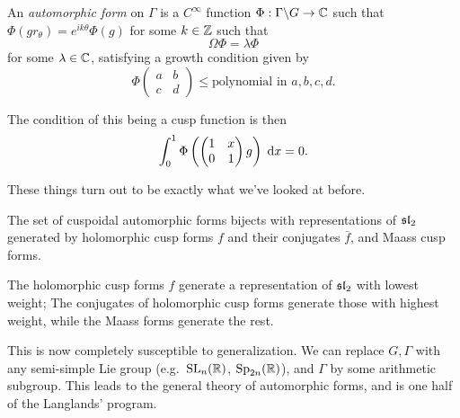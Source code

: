 \documentclass[a4paper]{article}
\begin{document}
\begin{defi}
  An \emph{automorphic form} on $\Gamma$ is a $C^\infty$ function $\Phi: \Gamma \backslash G \to \C$ such that $\Phi(g r_\theta) = e^{ik\theta} \Phi(g)$ for some $k \in \Z$ such that
  \[
    \Omega \Phi = \lambda \Phi
  \]
  for some $\lambda \in \C$, satisfying a growth condition given by
  \[
    \Phi
    \begin{pmatrix}
      a & b\\
      c & d
    \end{pmatrix} \leq \text{polynomial in }a, b, c, d.
  \]
\end{defi}

The condition of this being a cusp function is then
\[
  \int_0^1 \Phi \left(
  \begin{pmatrix}
    1 & x\\
    0 & 1
  \end{pmatrix}g\right) \;\d x = 0.
\]

These things turn out to be exactly what we've looked at before.
\begin{prop}
  The set of cuspoidal automorphic forms bijects with representations of $\sl_2$ generated by holomorphic cusp forms $f$ and their conjugates $\bar{f}$, and Maass cusp forms.

  The holomorphic cusp forms $f$ generate a representation of $\sl_2$ with lowest weight; The conjugates of holomorphic cusp forms generate those with highest weight, while the Maass forms generate the rest.
\end{prop}

This is now completely susceptible to generalization. We can replace $G, \Gamma$ with any semi-simple Lie group (e.g.\ $\SL_n(\R)$, $\Sp_{2n}(\R)$), and $\Gamma$ by some arithmetic subgroup. This leads to the general theory of automorphic forms, and is one half of the Langlands' program.


\printindex
\end{document}
